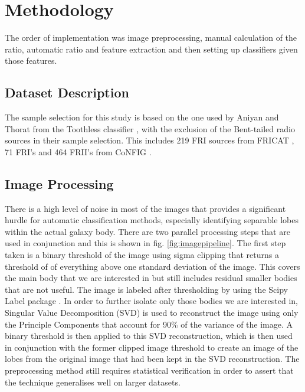 \documentclass[conference]{IEEEtran}
\begin{document}
\section{Methodology}
The order of implementation was image preprocessing, manual calculation of the ratio, automatic ratio and feature extraction and then setting up classifiers given those features.

\subsection{Dataset Description}
The sample selection for this study is based on the one used by Aniyan and Thorat from the Toothless classifier \cite{aniyan_thorat_2017}, with the exclusion of the Bent-tailed radio sources in their sample selection. This includes 219 FRI sources from FRICAT \cite{capetti_2016}, 71 FRI's and 464 FRII's from CoNFIG \cite{gendre_wall_2009}.
\subsection{Image Processing}
There is a high level of noise in most of the images that provides a significant hurdle for automatic classification methods, especially identifying separable lobes within the actual galaxy body. There are two parallel processing steps that are used in conjunction and this is shown in fig. \ref{fig:imagepipeline}. The first step taken is a binary threshold of the image using sigma clipping that returns a threshold of of everything above one standard deviation of the image. This covers the main body that we are interested in but still includes residual smaller bodies that are not useful. The image is labeled after thresholding by using the Scipy Label package \cite{scipy}. In order to further isolate only those bodies we are interested in, Singular Value Decomposition (SVD) is used to reconstruct the image using only the Principle Components that account for 90\% of the variance of the image. A binary threshold is then applied to this SVD reconstruction, which is then used in conjunction with the former clipped image threshold to create an image of the lobes from the original image that had been kept in the SVD reconstruction. The preprocessing method still requires statistical verification in order to assert that the technique generalises well on larger datasets.
\end{document}
